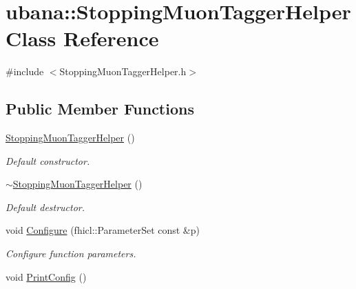 \hypertarget{classubana_1_1StoppingMuonTaggerHelper}{\section{ubana\-:\-:Stopping\-Muon\-Tagger\-Helper Class Reference}
\label{classubana_1_1StoppingMuonTaggerHelper}
}


{\ttfamily \#include $<$Stopping\-Muon\-Tagger\-Helper.\-h$>$}

\subsection*{Public Member Functions}
\begin{DoxyCompactItemize}
\item 
\hypertarget{classubana_1_1StoppingMuonTaggerHelper_afd832168d8c9f6c4f70a4dbe65508241}{\hyperlink{classubana_1_1StoppingMuonTaggerHelper_afd832168d8c9f6c4f70a4dbe65508241}{Stopping\-Muon\-Tagger\-Helper} ()}\label{classubana_1_1StoppingMuonTaggerHelper_afd832168d8c9f6c4f70a4dbe65508241}

\begin{DoxyCompactList}\small\item\em Default constructor. \end{DoxyCompactList}\item 
\hypertarget{classubana_1_1StoppingMuonTaggerHelper_a935a1d7fe295306f56d07a3c6402958b}{\hyperlink{classubana_1_1StoppingMuonTaggerHelper_a935a1d7fe295306f56d07a3c6402958b}{$\sim$\-Stopping\-Muon\-Tagger\-Helper} ()}\label{classubana_1_1StoppingMuonTaggerHelper_a935a1d7fe295306f56d07a3c6402958b}

\begin{DoxyCompactList}\small\item\em Default destructor. \end{DoxyCompactList}\item 
\hypertarget{classubana_1_1StoppingMuonTaggerHelper_a8a01db89766abfb548cacb0123a81b1e}{void \hyperlink{classubana_1_1StoppingMuonTaggerHelper_a8a01db89766abfb548cacb0123a81b1e}{Configure} (fhicl\-::\-Parameter\-Set const \&p)}\label{classubana_1_1StoppingMuonTaggerHelper_a8a01db89766abfb548cacb0123a81b1e}

\begin{DoxyCompactList}\small\item\em Configure function parameters. \end{DoxyCompactList}\item 
\hypertarget{classubana_1_1StoppingMuonTaggerHelper_af45f94eec54ee156f896986118598c6c}{void \hyperlink{classubana_1_1StoppingMuonTaggerHelper_af45f94eec54ee156f896986118598c6c}{Print\-Config} ()}\label{classubana_1_1StoppingMuonTaggerHelper_af45f94eec54ee156f896986118598c6c}


\end{DoxyCompactItemize}
